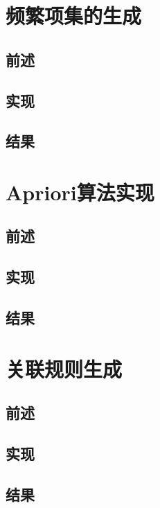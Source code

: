 \documentclass[a4paper]{article}
\begin{document}
\newpage

\section{频繁项集的生成}

\subsection{前述}

\subsection{实现}
\subsection{结果}

\newpage

\section{Apriori算法实现}

\subsection{前述}
\subsection{实现}
\subsection{结果}

\newpage

\section{关联规则生成}

\subsection{前述}
\subsection{实现}
\subsection{结果}

\newpage
\end{document}
